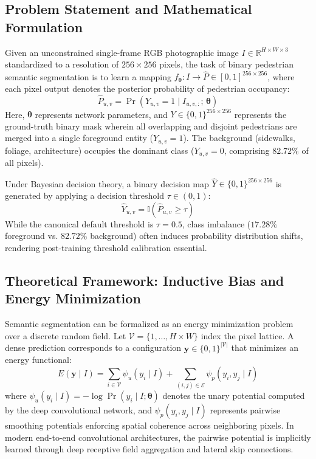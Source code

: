 \documentclass[10pt,a4paper]{article}
\begin{document}
\subsection{Problem Statement and Mathematical Formulation}
Given an unconstrained single-frame RGB photographic image $I \in \mathbb{R}^{H \times W \times 3}$ standardized to a resolution of $256 \times 256$ pixels, the task of binary pedestrian semantic segmentation is to learn a mapping $f_{\bm{\theta}}: I \to \widehat{P} \in [0, 1]^{256 \times 256}$, where each pixel output denotes the posterior probability of pedestrian occupancy:
\begin{equation}
    \widehat{P}_{u,v} = \Pr\left(Y_{u,v} = 1 \mid I_{u,v,:}; \, \bm{\theta}\right)
    \label{eq:prob_formulation}
\end{equation}
Here, $\bm{\theta}$ represents network parameters, and $Y \in \{0, 1\}^{256 \times 256}$ represents the ground-truth binary mask wherein all overlapping and disjoint pedestrians are merged into a single foreground entity ($Y_{u,v}=1$). The background (sidewalks, foliage, architecture) occupies the dominant class ($Y_{u,v}=0$, comprising $82.72\%$ of all pixels).

Under Bayesian decision theory, a binary decision map $\widehat{Y} \in \{0, 1\}^{256 \times 256}$ is generated by applying a decision threshold $\tau \in (0, 1)$:
\begin{equation}
    \widehat{Y}_{u,v} = \mathbb{I}\left(\widehat{P}_{u,v} \ge \tau\right)
    \label{eq:threshold_rule}
\end{equation}
While the canonical default threshold is $\tau = 0.5$, class imbalance ($17.28\%$ foreground vs. $82.72\%$ background) often induces probability distribution shifts, rendering post-training threshold calibration essential.

\subsection{Theoretical Framework: Inductive Bias and Energy Minimization}
Semantic segmentation can be formalized as an energy minimization problem over a discrete random field. Let $\mathcal{V} = \{1, \dots, H \times W\}$ index the pixel lattice. A dense prediction corresponds to a configuration $\bm{y} \in \{0, 1\}^{|\mathcal{V}|}$ that minimizes an energy functional:
\begin{equation}
    E(\bm{y} \mid I) = \sum_{i \in \mathcal{V}} \psi_u(y_i \mid I) + \sum_{(i,j) \in \mathcal{E}} \psi_p(y_i, y_j \mid I)
    \label{eq:crf_energy}
\end{equation}
where $\psi_u(y_i \mid I) = -\log \Pr(y_i \mid I; \bm{\theta})$ denotes the unary potential computed by the deep convolutional network, and $\psi_p(y_i, y_j \mid I)$ represents pairwise smoothing potentials enforcing spatial coherence across neighboring pixels. In modern end-to-end convolutional architectures, the pairwise potential is implicitly learned through deep receptive field aggregation and lateral skip connections.
\end{document}
